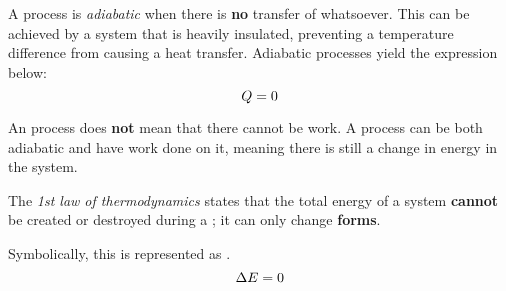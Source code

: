 \begin{definition}[Adiabatic]\label{def:Adiabatic}
  A process is \emph{adiabatic} when there is \textbf{no} transfer of  whatsoever.
  This can be achieved by a system that is heavily insulated, preventing a temperature difference from causing a heat transfer.
  Adiabatic processes yield the expression below:
  \begin{equation}\label{eq:Adiabatic}
    Q = 0
  \end{equation}

  \begin{remark}
    An  process does \textbf{not} mean that there cannot be work.
    A process can be both adiabatic and have work done on it, meaning there is still a change in energy in the system.
  \end{remark}
\end{definition}

\begin{definition}\label{def:1_Law_Thermo}
  The \emph{1st law of thermodynamics} states that the total energy of a system \textbf{cannot} be created or destroyed during a ; it can only change \textbf{forms}.

  Symbolically, this is represented as .
  \begin{equation}\label{eq:1_Law_Thermo}
    \Delta E = 0
  \end{equation}
\end{definition}


